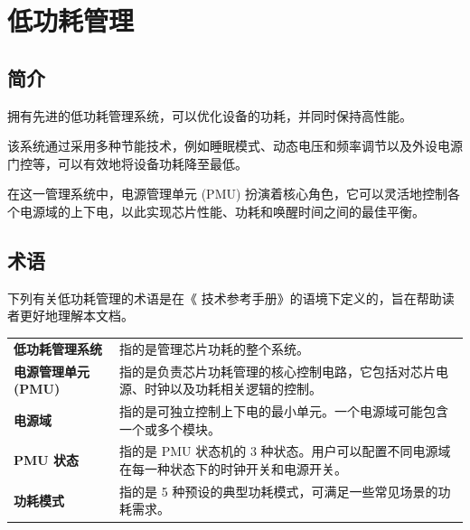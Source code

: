 \documentclass[main\_\_CN.tex]{subfiles}
\begin{document}

\ifglobal
\else
    {\let\clearpage\relax \listoftodos}
    {\let\clearpage\relax \listofdonetodos}
    \tableofcontents
\fi



\hypertarget{lowpowm}{}
\chapter{低功耗管理}
\label{mod:lowpowm}

\section{简介}

\chipname{} 拥有先进的低功耗管理系统，可以优化设备的功耗，并同时保持高性能。

该系统通过采用多种节能技术，例如睡眠模式、动态电压和频率调节以及外设电源门控等，可以有效地将设备功耗降至最低。

在这一管理系统中，电源管理单元 (PMU) 扮演着核心角色，它可以灵活地控制各个电源域的上下电，以此实现芯片性能、功耗和唤醒时间之间的最佳平衡。

\section{术语}

下列有关低功耗管理的术语是在《\chipname{} 技术参考手册》的语境下定义的，旨在帮助读者更好地理解本文档。

\begin{longtable}[c]{ R{4cm} p{12cm} }
\textbf{低功耗管理系统} & 指的是管理芯片功耗的整个系统。\\
\textbf{电源管理单元 (PMU)} & 指的是负责芯片功耗管理的核心控制电路，它包括对芯片电源、时钟以及功耗相关逻辑的控制。\\
\textbf{电源域} & 指的是可独立控制上下电的最小单元。一个电源域可能包含一个或多个模块。 \\
\textbf{PMU 状态} & 指的是 PMU 状态机的 3 种状态。用户可以配置不同电源域在每一种状态下的时钟开关和电源开关。\\
\textbf{功耗模式} & 指的是 5 种预设的典型功耗模式，可满足一些常见场景的功耗需求。\\
\end{longtable}
\end{document}

